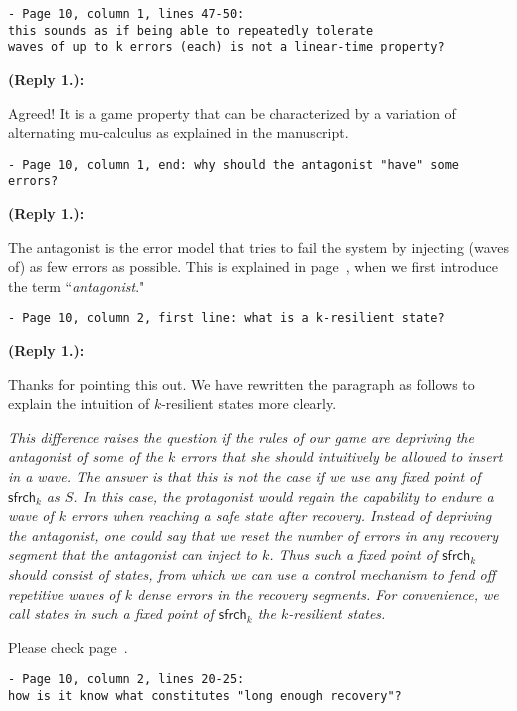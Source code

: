 \documentclass[times,10pt,twocolumn]{article}
\newcommand\safe{\mathsf{sfrch}}
\newcounter{cabbage0}
\newcounter{cabbage1}
\newcounter{cabbage2}
\newcounter{cabbage3}
\newcounter{bean0}
\newcounter{bean1}
\newcounter{bean2}
\newcounter{bean3}
\newcounter{bean4}
\newcounter{bean5}
\newcounter{bean6}
\newenvironment{reply1}{\begin{list}{\bf (Reply 1.\arabic{bean1}):} 
        {\usecounter{bean1}\setcounter{bean1}{\value{cabbage1}} \item \setcounter{cabbage1}{\value{bean1}} 
        }
}{\end{list}}
\begin{document}
\begin{verbatim} 
- Page 10, column 1, lines 47-50: 
this sounds as if being able to repeatedly tolerate 
waves of up to k errors (each) is not a linear-time property?
\end{verbatim}
\begin{reply1} 
Agreed!
It is a game property that can be characterized by a variation of 
alternating mu-calculus as explained in the manuscript.  
\end{reply1}
\begin{verbatim} 
- Page 10, column 1, end: why should the antagonist "have" some errors?
\end{verbatim}
\begin{reply1} 
The antagonist is the error model that tries to fail the system  by
injecting (waves of) as few errors as possible. 
This is explained in page~\pageref{reply1.antagonist.inject.errors}, when 
we first introduce the term ``{\em antagonist}." 
\end{reply1}
\begin{verbatim} 
- Page 10, column 2, first line: what is a k-resilient state? 
\end{verbatim}
\begin{reply1} 
Thanks for pointing this out. 
We have rewritten the paragraph as follows to explain the 
intuition of $k$-resilient states more clearly.
\begin{center} 
\parbox{140mm}{\em 
This difference raises the question 
if the rules of our game are depriving the antagonist 
of some of the $k$ errors that she should intuitively be allowed to insert in a wave.
The answer is that this is not the case 
if we use any fixed point of $\safe_k$ as $S$.
In this case, the protagonist would regain the capability to endure a wave of $k$ errors when reaching a safe state after recovery.
Instead of depriving the antagonist, 
one could say that we reset the number of errors in any recovery 
segment that the antagonist can inject to $k$.
Thus such a fixed point of $\safe_k$ should consist of 
states, from which we can use a control mechanism to fend off 
repetitive waves of $k$ dense errors in the recovery segments.  
For convenience, we call states in such a fixed point of $\safe_k$  
the $k$-resilient states.
}
\end{center} 
Please check page~\pageref{reply1.k.resilient.states}.  
\end{reply1}
\begin{verbatim} 
- Page 10, column 2, lines 20-25: 
how is it know what constitutes "long enough recovery"?
\end{verbatim}
\end{document}
